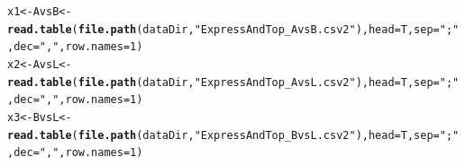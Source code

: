 \documentclass{article}\usepackage[]{graphicx}\usepackage[]{color}
\makeatletter
\newcommand{\hlnum}[1]{\textcolor[rgb]{0.686,0.059,0.569}{#1}}%
\newcommand{\hlstr}[1]{\textcolor[rgb]{0.192,0.494,0.8}{#1}}%
\newcommand{\hlstd}[1]{\textcolor[rgb]{0.345,0.345,0.345}{#1}}%
\newcommand{\hlkwb}[1]{\textcolor[rgb]{0.69,0.353,0.396}{#1}}%
\newcommand{\hlkwc}[1]{\textcolor[rgb]{0.333,0.667,0.333}{#1}}%
\newcommand{\hlkwd}[1]{\textcolor[rgb]{0.737,0.353,0.396}{\textbf{#1}}}%
\newenvironment{kframe}{%
 \def\at@end@of@kframe{}%
 \ifinner\ifhmode%
  \def\at@end@of@kframe{\end{minipage}}%
  \begin{minipage}{\columnwidth}%
 \fi\fi%
 \def\FrameCommand##1{\hskip\@totalleftmargin \hskip-\fboxsep
 \colorbox{shadecolor}{##1}\hskip-\fboxsep
     \hskip-\linewidth \hskip-\@totalleftmargin \hskip\columnwidth}%
 \MakeFramed {\advance\hsize-\width
   \@totalleftmargin\z@ \linewidth\hsize
   \@setminipage}}%
 {\par\unskip\endMakeFramed%
 \at@end@of@kframe}
\newenvironment{knitrout}{}{} %
\makeatother
\begin{document}
\begin{knitrout}
\color{fgcolor}\begin{kframe}
\begin{alltt}
\hlstd{x1}\hlkwb{<-} \hlstd{AvsB} \hlkwb{<-} \hlkwd{read.table}\hlstd{(}\hlkwd{file.path}\hlstd{(dataDir,} \hlstr{"ExpressAndTop_AvsB.csv2"}\hlstd{),} \hlkwc{head}\hlstd{=T,} \hlkwc{sep}\hlstd{=}\hlstr{";"}\hlstd{,} \hlkwc{dec}\hlstd{=}\hlstr{","}\hlstd{,} \hlkwc{row.names}\hlstd{=}\hlnum{1}\hlstd{)}
\hlstd{x2}\hlkwb{<-} \hlstd{AvsL} \hlkwb{<-} \hlkwd{read.table}\hlstd{(}\hlkwd{file.path}\hlstd{(dataDir,} \hlstr{"ExpressAndTop_AvsL.csv2"}\hlstd{),} \hlkwc{head}\hlstd{=T,} \hlkwc{sep}\hlstd{=}\hlstr{";"}\hlstd{,} \hlkwc{dec}\hlstd{=}\hlstr{","}\hlstd{,} \hlkwc{row.names}\hlstd{=}\hlnum{1}\hlstd{)}
\hlstd{x3}\hlkwb{<-} \hlstd{BvsL} \hlkwb{<-} \hlkwd{read.table}\hlstd{(}\hlkwd{file.path}\hlstd{(dataDir,} \hlstr{"ExpressAndTop_BvsL.csv2"}\hlstd{),} \hlkwc{head}\hlstd{=T,} \hlkwc{sep}\hlstd{=}\hlstr{";"}\hlstd{,} \hlkwc{dec}\hlstd{=}\hlstr{","}\hlstd{,} \hlkwc{row.names}\hlstd{=}\hlnum{1}\hlstd{)}


\end{alltt}
\end{kframe}
\end{knitrout}
\end{document}
